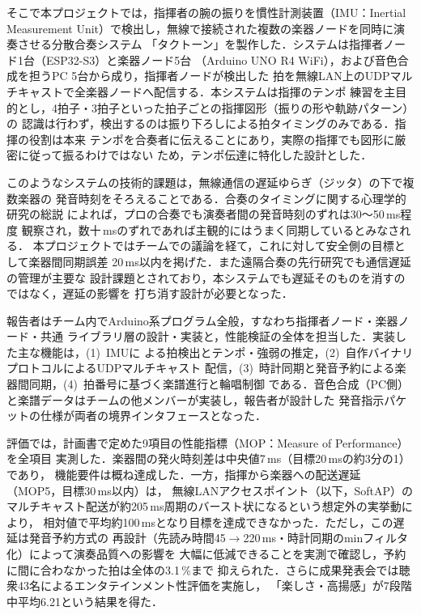 \documentclass[uplatex,dvipdfmx]{jlreq}
\begin{document}
そこで本プロジェクトでは，指揮者の腕の振りを慣性計測装置（IMU：Inertial Measurement
Unit）で検出し，無線で接続された複数の楽器ノードを同時に演奏させる分散合奏システム
「タクトーン」を製作した．システムは指揮者ノード1台（ESP32-S3）と楽器ノード5台
（Arduino UNO R4 WiFi），および音色合成を担うPC 5台から成り，指揮者ノードが検出した
拍を無線LAN上のUDPマルチキャストで全楽器ノードへ配信する．本システムは指揮のテンポ
練習を主目的とし，4拍子・3拍子といった拍子ごとの指揮図形（振りの形や軌跡パターン）の
認識は行わず，検出するのは振り下ろしによる拍タイミングのみである．指揮の役割は本来
テンポを合奏者に伝えることにあり，実際の指揮でも図形に厳密に従って振るわけではない
ため，テンポ伝達に特化した設計とした．

このようなシステムの技術的課題は，無線通信の遅延ゆらぎ（ジッタ）の下で複数楽器の
発音時刻をそろえることである．合奏のタイミングに関する心理学的研究の総説
\cite{ref:douki}によれば，プロの合奏でも演奏者間の発音時刻のずれは30〜50\,ms程度
観察され，数十\,msのずれであれば主観的にはうまく同期しているとみなされる．
本プロジェクトではチームでの議論を経て，これに対して安全側の目標として楽器間同期誤差
20\,ms以内を掲げた．また遠隔合奏の先行研究\cite{ref:chien}でも通信遅延の管理が主要な
設計課題とされており，本システムでも遅延そのものを消すのではなく，遅延の影響を
打ち消す設計が必要となった．

報告者はチーム内でArduino系プログラム全般，すなわち指揮者ノード・楽器ノード・共通
ライブラリ層の設計・実装と，性能検証の全体を担当した．実装した主な機能は，(1)~IMUに
よる拍検出とテンポ・強弱の推定，(2)~自作バイナリプロトコルによるUDPマルチキャスト
配信，(3)~時計同期と発音予約による楽器間同期，(4)~拍番号に基づく楽譜進行と輪唱制御
である．音色合成（PC側）と楽譜データはチームの他メンバーが実装し，報告者が設計した
発音指示パケットの仕様が両者の境界インタフェースとなった．

評価では，計画書で定めた9項目の性能指標（MOP：Measure of Performance）を全項目
実測した．楽器間の発火時刻差は中央値7\,ms（目標20\,msの約3分の1）であり，
機能要件は概ね達成した．一方，指揮から楽器への配送遅延（MOP5，目標30\,ms以内）は，
無線LANアクセスポイント（以下，SoftAP）の
マルチキャスト配送が約205\,ms周期のバースト状になるという想定外の実挙動により，
相対値で平均約100\,msとなり目標を達成できなかった．ただし，この遅延は発音予約方式の
再設計（先読み時間45$\to$220\,ms・時計同期のminフィルタ化）によって演奏品質への影響を
大幅に低減できることを実測で確認し，予約に間に合わなかった拍は全体の3.1\,\%まで
抑えられた．さらに成果発表会では聴衆43名によるエンタテインメント性評価を実施し，
「楽しさ・高揚感」が7段階中平均6.21という結果を得た．
\end{document}
